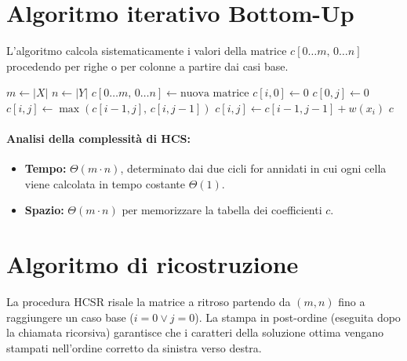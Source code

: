 \section{Algoritmo iterativo Bottom-Up}

L'algoritmo calcola sistematicamente i valori della matrice $c[0 \dots m, \, 0 \dots n]$ procedendo per righe o per colonne a partire dai casi base.

\begin{algorithm}[H]
\caption{Calcolo della matrice HCS}\label{alg:hcs}
\begin{algorithmic}[1]
    \State $m \gets |X|$
    \State $n \gets |Y|$
    \State $c[0 \dots m, \, 0 \dots n] \gets \text{nuova matrice}$
    \Statex {}
        \State $c[i, 0] \gets 0$
    \EndFor
        \State $c[0, j] \gets 0$
    \EndFor
    \Statex {}
                \State $c[i, j] \gets \max(c[i-1, j], \, c[i, j-1])$
            \Else
                \State $c[i, j] \gets c[i-1, j-1] + w(x_i)$
            \EndIf
        \EndFor
    \EndFor
    \State \Return $c$
\EndProcedure
\end{algorithmic}
\end{algorithm}

\paragraph{Analisi della complessità di \textsc{HCS}:}
\begin{itemize}
    \item \textbf{Tempo:} $\Theta(m \cdot n)$, determinato dai due cicli for annidati in cui ogni cella viene calcolata in tempo costante $\Theta(1)$.
    \item \textbf{Spazio:} $\Theta(m \cdot n)$ per memorizzare la tabella dei coefficienti $c$.
\end{itemize}

\newpage
\section{Algoritmo di ricostruzione}

La procedura \textsc{HCSR} risale la matrice a ritroso partendo da $(m, n)$ fino a raggiungere un caso base ($i=0 \lor j=0$). La stampa in post-ordine (eseguita dopo la chiamata ricorsiva) garantisce che i caratteri della soluzione ottima vengano stampati nell'ordine corretto da sinistra verso destra.

